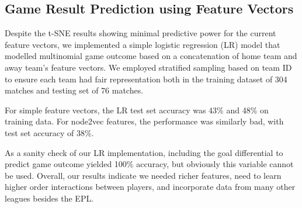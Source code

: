 \subsection{Game Result Prediction using Feature Vectors}
Despite the t-SNE results showing minimal predictive power for the current feature vectors, we implemented a simple logistic regression (LR) model that modelled multinomial game outcome based on a concatenation of home team and away team's feature vectors. We employed stratified sampling based on team ID to ensure each team had fair representation both in the training dataset of 304 matches and testing set of 76 matches. 

For simple feature vectors, the LR test set accuracy was 43\% and 48\% on training data. For node2vec features, the performance was similarly bad, with test set accuracy of 38\%. 

As a sanity check of our LR implementation, including the goal differential to predict game outcome yielded 100\% accuracy, but obviously this variable cannot be used. Overall, our results indicate we needed richer features, need to learn higher order interactions between players, and incorporate data from many other leagues besides the EPL.

%
%
%
%
%
